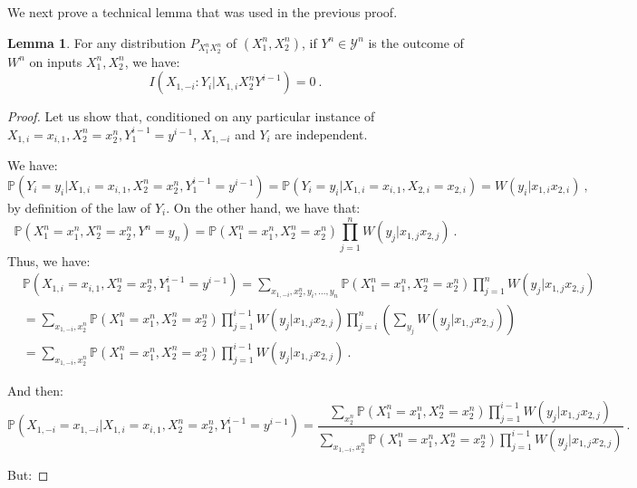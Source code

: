 \documentclass[11pt]{article}
\theoremstyle{definition}
\newtheorem{lem}[theo]{Lemma}
\theoremstyle{remark}
\begin{document}
  We next prove a technical lemma that was used in the previous proof.
  
      \begin{lem}
        \label{lem:claim1}
        For any distribution $P_{X_1^nX_2^n}$ of $(X_1^n,X_2^n)$, if $Y^n \in \mathcal{Y}^n$ is the outcome of $W^n$ on inputs $X_1^n,X_2^n$, we have:
        \[ I(X_{1,-i}:Y_i|X_{1,i}X_2^nY^{i-1}) = 0 \ . \]
      \end{lem}
      \begin{proof}
        Let us show that, conditioned on any particular instance of $X_{1,i}=x_{i,1}, X_2^n=x_2^n, Y_1^{i-1}=y^{i-1}$, $X_{1,-i}$ and $Y_i$ are independent.

        We have:
        \[ \mathbb{P}\left(Y_i = y_i |  X_{1,i}=x_{i,1}, X_2^n=x_2^n, Y_1^{i-1}=y^{i-1}\right) = \mathbb{P}\left(Y_i = y_i |  X_{1,i}=x_{i,1}, X_{2,i}=x_{2,i}\right) = W(y_i|x_{1,i}x_{2,i}) \ , \]
        by definition of the law of $Y_i$. On the other hand, we have that:
        \[ \mathbb{P}\left(X_1^n=x_1^n,X_2^n=x_2^n,Y^n=y_n\right) = \mathbb{P}\left(X_1^n=x_1^n,X_2^n=x_2^n\right)\prod_{j=1}^n W(y_j|x_{1,j}x_{2,j}) \ . \]
        Thus, we have:
        \begin{equation}
          \begin{aligned}
            &\mathbb{P}\left(X_{1,i}=x_{i,1}, X_2^n=x_2^n, Y_1^{i-1}=y^{i-1}\right) = \sum_{x_{1,-i},x_2^n,y_i,\ldots, y_n}\mathbb{P}\left(X_1^n=x_1^n,X_2^n=x_2^n\right)\prod_{j=1}^n W(y_j|x_{1,j}x_{2,j})\\
            &= \sum_{x_{1,-i},x_2^n} \mathbb{P}\left(X_1^n=x_1^n,X_2^n=x_2^n\right)\prod_{j=1}^{i-1}W(y_j|x_{1,j}x_{2,j})\prod_{j=i}^n\left(\sum_{y_j}W(y_j|x_{1,j}x_{2,j})\right)\\
            &= \sum_{x_{1,-i},x_2^n} \mathbb{P}\left(X_1^n=x_1^n,X_2^n=x_2^n\right)\prod_{j=1}^{i-1}W(y_j|x_{1,j}x_{2,j}) \ .
          \end{aligned}
        \end{equation}


        And then:
        \[ \mathbb{P}\left(X_{1,-i}=x_{1,-i}|X_{1,i}=x_{i,1}, X_2^n=x_2^n, Y_1^{i-1}=y^{i-1}\right) = \frac{\sum_{x_2^n}\mathbb{P}\left(X_1^n=x_1^n,X_2^n=x_2^n\right)\prod_{j=1}^{i-1} W(y_j|x_{1,j}x_{2,j})}{\sum_{x_{1,-i},x_2^n}\mathbb{P}\left(X_1^n=x_1^n,X_2^n=x_2^n\right)\prod_{j=1}^{i-1} W(y_j|x_{1,j}x_{2,j})} \ . \]

        But:


\end{proof}
\end{document}
